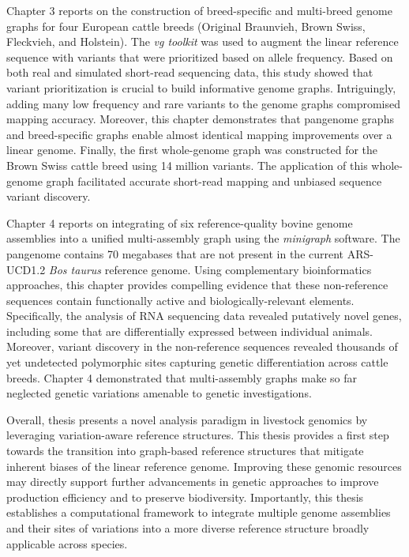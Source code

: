 \documentclass[11 pt, a4paper, notitlepage, twoside]{report}
\begin{document}
Chapter 3 reports on the construction of breed-specific and multi-breed genome graphs for four European cattle breeds (Original Braunvieh, Brown Swiss, Fleckvieh, and Holstein).  The \emph{vg toolkit} was used to augment the linear reference sequence with variants that were prioritized based on allele frequency. Based on both real and simulated short-read sequencing data, this study showed that variant prioritization is crucial to build informative genome graphs. Intriguingly, adding many low frequency and rare variants to the genome graphs compromised mapping accuracy. Moreover, this chapter demonstrates that pangenome graphs and breed-specific graphs enable almost identical mapping improvements over a linear genome. Finally, the first whole-genome graph was constructed for the Brown Swiss cattle breed using 14 million variants. The application of this whole-genome graph facilitated accurate short-read mapping and unbiased sequence variant discovery. 

\thispagestyle{plain}

Chapter 4 reports on integrating of six reference-quality bovine genome assemblies into a unified multi-assembly graph using the \emph{minigraph} software. The pangenome contains 70 megabases that are not present in the current ARS-UCD1.2 \emph{Bos taurus} reference genome.  Using complementary bioinformatics approaches, this chapter provides compelling evidence that these non-reference sequences contain functionally active and biologically-relevant elements. Specifically, the analysis of RNA sequencing data revealed putatively novel genes, including some that are differentially expressed between individual animals. Moreover, variant discovery in the non-reference sequences revealed thousands of yet undetected polymorphic sites capturing genetic differentiation across cattle breeds. Chapter 4 demonstrated that multi-assembly graphs make so far neglected genetic variations amenable to genetic investigations. 

Overall, thesis presents a novel analysis paradigm in livestock genomics by leveraging variation-aware reference structures. This thesis provides a first step towards the transition into graph-based reference structures that mitigate inherent biases of the linear reference genome. Improving these genomic resources may directly support further advancements in genetic approaches to improve production efficiency and to preserve biodiversity. Importantly, this thesis establishes a computational framework to integrate multiple genome assemblies and their sites of variations into a more diverse reference structure broadly applicable across species. 
\end{document}
